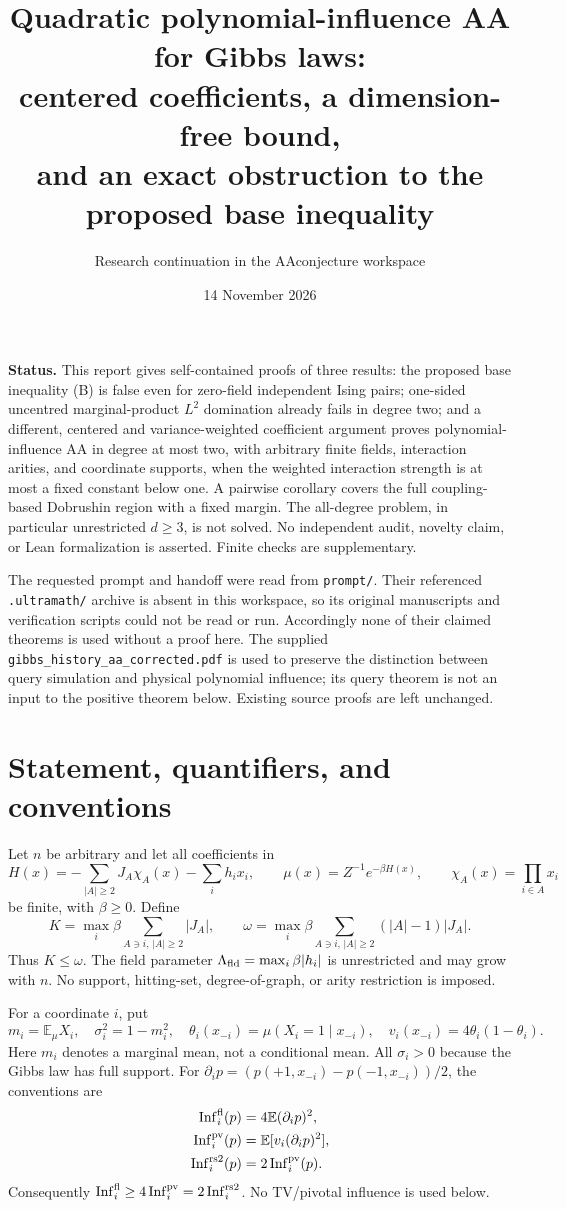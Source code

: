 \documentclass[11pt]{article}
\title{Quadratic polynomial-influence AA for Gibbs laws:\\
centered coefficients, a dimension-free bound,\\and an exact obstruction to the proposed base inequality}
\author{Research continuation in the AAconjecture workspace}
\date{14 November 2026}
\newcommand{\E}{\mathbb E}
\newcommand{\Inf}{\operatorname{Inf}}
\begin{document}
\maketitle

\noindent\textbf{Status.}
This report gives self-contained proofs of three results: the proposed
base inequality (B) is false even for zero-field independent Ising pairs;
one-sided uncentred marginal-product $L^2$ domination already fails in
degree two; and a different, centered and variance-weighted coefficient
argument proves polynomial-influence AA in degree at most two, with
arbitrary finite fields, interaction arities, and coordinate supports,
when the weighted interaction strength is at most a fixed constant below
one. A pairwise corollary covers the full coupling-based Dobrushin region
with a fixed margin. The all-degree problem, in particular unrestricted
$d\ge3$, is not solved. No independent audit, novelty claim, or Lean
formalization is asserted. Finite checks are supplementary.

The requested prompt and handoff were read from \texttt{prompt/}.
Their referenced \texttt{.ultramath/} archive is absent in this workspace,
so its original manuscripts and verification scripts could not be read
or run. Accordingly none of their claimed theorems is used without a
proof here. The supplied \texttt{gibbs\_history\_aa\_corrected.pdf}
is used to preserve the distinction between query simulation and
physical polynomial influence; its query theorem is not an input to
the positive theorem below. Existing source proofs are left unchanged.

\section{Statement, quantifiers, and conventions}

Let $n$ be arbitrary and let all coefficients in
\[
 H(x)=-\sum_{|A|\ge2}J_A\chi_A(x)-\sum_i h_ix_i,
 \qquad \mu(x)=Z^{-1}e^{-\beta H(x)},\qquad
 \chi_A(x)=\prod_{i\in A}x_i
\]
be finite, with $\beta\ge0$. Define
\[
 K=\max_i\beta\sum_{A\ni i,\,|A|\ge2}|J_A|,
 \qquad
 \omega=\max_i\beta\sum_{A\ni i,\,|A|\ge2}(|A|-1)|J_A|.
\]
Thus $K\le\omega$. The field parameter
$\Lambda_{\rm fld}=\max_i\beta|h_i|$ is unrestricted and may grow
with $n$. No support, hitting-set, degree-of-graph, or arity restriction
is imposed.

For a coordinate $i$, put
\[
 m_i=\E_\mu X_i,\quad \sigma_i^2=1-m_i^2,\quad
 \theta_i(x_{-i})=\mu(X_i=1\mid x_{-i}),\quad
 v_i(x_{-i})=4\theta_i(1-\theta_i).
\]
Here $m_i$ denotes a marginal mean, not a conditional mean. All
$\sigma_i>0$ because the Gibbs law has full support. For
$\partial_i p=(p(+1,x_{-i})-p(-1,x_{-i}))/2$, the conventions are
\begin{align*}
 \Inf_i^{\rm fl}(p)&=4\E(\partial_i p)^2,\\
 \Inf_i^{\rm pv}(p)&=\E[v_i(\partial_i p)^2],\\
 \Inf_i^{\rm rs2}(p)&=2\Inf_i^{\rm pv}(p).
\end{align*}
Consequently $\Inf_i^{\rm fl}\ge4\Inf_i^{\rm pv}
=2\Inf_i^{\rm rs2}$. No TV/pivotal influence is used below.
\end{document}
